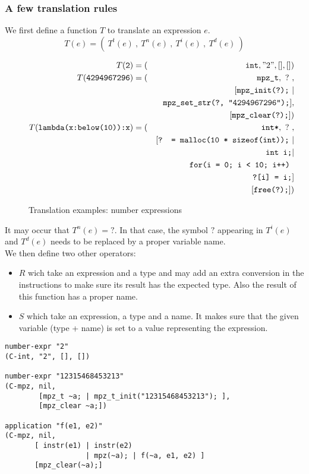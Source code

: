 \documentclass[12pt,a4paper]{article}
\newcommand{\cl}[1]{\texttt{#1}}
\begin{document}
\subsubsection{A few translation rules}

We first define a function $T$ to translate an expression $e$.
$$ T(e) = ( \ T^t(e) \ , \ T^n(e) \ , \ T^i(e) \ , \ T^d(e) \ ) $$

\begin{figure}[!ht]
\begin{eqnarray*}
T(\cl{2}) &= (& \cl{int}, "2", [], []) \\
T(\cl{4294967296}) &= (& \cl{mpz\_t}, \ ? \ , \\
&& [ \cl{mpz\_init(?);} \ | \\
&& \ \cl{mpz\_set\_str(?, "4294967296");} ],\\
&& [ \cl{mpz\_clear(?);} ]) \\
T(\cl{lambda(x:below(10)):x}) &= (& \cl{int*}, \ ? \ , \\
&& [ \cl{? = malloc(10 * sizeof(int));} \ | \\
&& \ \cl{int i;} | \\
&& \ \cl{for(i = 0; i < 10; i++) }\\
&& \ \ \ \cl{?[i] = i;}  ]\\
&& [ \cl{free(?);} ])
\end{eqnarray*}
\caption{Translation examples: number expressions}
\end{figure}

It may occur that $T^n(e) = ?$. In that case, the symbol $?$ appearing in $T^i(e)$ and $T^d(e)$ needs to be replaced by a proper variable name.\\

We then define two other operators:
\begin{itemize}
\item $R$ wich take an expression and a type and may add an extra conversion in the instructions to make sure its result has the expected type. Also the result of this function has a proper name.
\item $S$ which take an expression, a type and a name. It makes sure that the given variable (type + name) is set to a value representing the expression.
\end{itemize}






\begin{lstlisting}
number-expr "2"
(C-int, "2", [], [])

number-expr "12315468453213"
(C-mpz, nil,
        [mpz_t ~a; | mpz_t_init("12315468453213"); ],
        [mpz_clear ~a;])

application "f(e1, e2)"
(C-mpz, nil,
       [ instr(e1) | instr(e2)
                   | mpz(~a); | f(~a, e1, e2) ]
       [mpz_clear(~a);]
\end{lstlisting}
\end{document}
